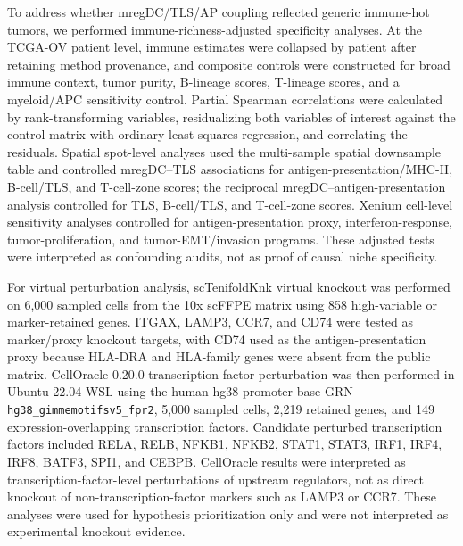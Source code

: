 \documentclass[cancers,article,submit,pdftex,moreauthors]{Definitions/mdpi}
\begin{document}
To address whether mregDC/TLS/AP coupling reflected generic immune-hot tumors, we performed immune-richness-adjusted specificity analyses. At the TCGA-OV patient level, immune estimates were collapsed by patient after retaining method provenance, and composite controls were constructed for broad immune context, tumor purity, B-lineage scores, T-lineage scores, and a myeloid/APC sensitivity control. Partial Spearman correlations were calculated by rank-transforming variables, residualizing both variables of interest against the control matrix with ordinary least-squares regression, and correlating the residuals. Spatial spot-level analyses used the multi-sample spatial downsample table and controlled mregDC--TLS associations for antigen-presentation/MHC-II, B-cell/TLS, and T-cell-zone scores; the reciprocal mregDC--antigen-presentation analysis controlled for TLS, B-cell/TLS, and T-cell-zone scores. Xenium cell-level sensitivity analyses controlled for antigen-presentation proxy, interferon-response, tumor-proliferation, and tumor-EMT/invasion programs. These adjusted tests were interpreted as confounding audits, not as proof of causal niche specificity.

For virtual perturbation analysis, scTenifoldKnk virtual knockout was performed on 6,000 sampled cells from the 10x scFFPE matrix using 858 high-variable or marker-retained genes. ITGAX, LAMP3, CCR7, and CD74 were tested as marker/proxy knockout targets, with CD74 used as the antigen-presentation proxy because HLA-DRA and HLA-family genes were absent from the public matrix\cite{bib113}. CellOracle 0.20.0 transcription-factor perturbation was then performed in Ubuntu-22.04 WSL using the human hg38 promoter base GRN \texttt{hg38\_gimmemotifsv5\_fpr2}, 5,000 sampled cells, 2,219 retained genes, and 149 expression-overlapping transcription factors\cite{bib114}. Candidate perturbed transcription factors included RELA, RELB, NFKB1, NFKB2, STAT1, STAT3, IRF1, IRF4, IRF8, BATF3, SPI1, and CEBPB. CellOracle results were interpreted as transcription-factor-level perturbations of upstream regulators, not as direct knockout of non-transcription-factor markers such as LAMP3 or CCR7. These analyses were used for hypothesis prioritization only and were not interpreted as experimental knockout evidence.
\end{document}
